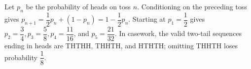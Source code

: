 Let $p_n$ be the probability of heads on toss $n$. Conditioning on the preceding toss gives $p_{n+1}=\dfrac{1}{2}p_n+(1-p_n)=1-\dfrac{1}{2}p_n$. Starting at $p_1=\dfrac{1}{2}$ gives $p_2=\dfrac{3}{4},p_3=\dfrac{5}{8},p_4=\dfrac{11}{16}$, and $p_5=\boxed{\dfrac{21}{32}}$. In casework, the valid two-tail sequences ending in heads are THTHH, THHTH, and HTHTH; omitting THHTH loses probability $\dfrac{1}{8}$.
